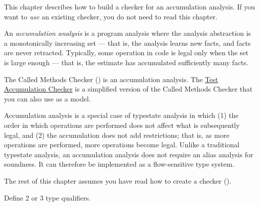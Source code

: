 

This chapter describes how to build a checker for an accumulation analysis.
If you want to \emph{use} an existing checker, you do not need to read this chapter.

An \emph{accumulation analysis} is a program analysis where the
analysis abstraction is a monotonically increasing set --- that is, the
analysis learns new facts, and facts are never retracted.
Typically, some operation in code is legal
only when the set is large enough --- that is, the estimate has accumulated
sufficiently many facts.

The Called Methods Checker ()
is an accumulation analysis.
The
\href{https://github.com/typetools/checker-framework/blob/master/framework/src/test/java/org/checkerframework/framework/testchecker/testaccumulation/TestAccumulationChecker.java}{Test Accumulation Checker}
is a simplified version of the Called Methods Checker that you can also use as a model.

Accumulation analysis is a special case of typestate analysis in which
(1) the order in which operations are performed does not affect what is subsequently legal,
and (2) the accumulation does not add restrictions; that is, as
more operations are performed, more operations become legal.
Unlike a traditional typestate analysis, an accumulation analysis does
not require an alias analysis for soundness. It can therefore be implemented
as a flow-sensitive type system.

The rest of this chapter assumes you have read how to create a checker
().


Define 2 or 3 type qualifiers.

